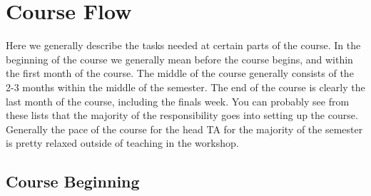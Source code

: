 \documentclass[12pt]{article}
\begin{document}
\newpage
\section{Course Flow} \label{sec:cf}

Here we generally describe the tasks needed at certain parts of the course. In the beginning of the course we generally mean before the course begins, and within the first month of the course. The middle of the course generally consists of the 2-3 months within the middle of the semester. The end of the course is clearly the last month of the course, including the finals week. You can probably see from these lists that the majority of the responsibility goes into setting up the course. Generally the pace of the course for the head TA for the majority of the semester is pretty relaxed outside of teaching in the workshop.

\subsection{Course Beginning} \label{sec:cb}
\end{document}
